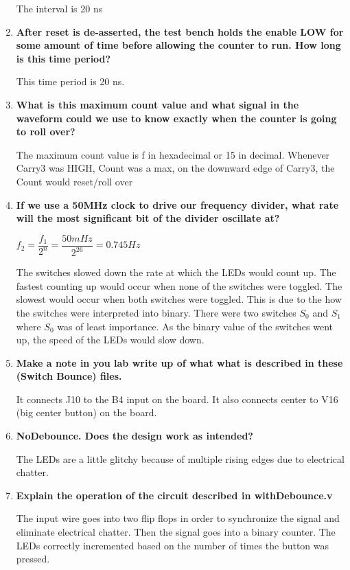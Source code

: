 \documentclass[a4paper,12pt]{article}
\begin{document}
\begin{enumerate}
  The interval is 20 ns
  
  \item \textbf{After reset is de-asserted, the test bench holds the enable LOW for some amount of time before 
  allowing the counter to run. How long is this time period?}
  
  This time period is 20 ns.
  
  \item \textbf{What is this maximum count value and what signal in the waveform could we use to know
  exactly when the counter is going to roll over?}
  
  The maximum count value is f in hexadecimal or 15 in decimal. Whenever Carry3 was HIGH, Count was a max, on the downward edge of Carry3, the Count would reset/roll over
  
  \item \textbf{If we use a 50MHz clock to drive our frequency divider, what rate will the most significant bit
  of the divider oscillate at?}
  
  $f_2 = \dfrac{f_1}{2^n} = \dfrac{50 mHz}{2^{26}} = 0.745 Hz$
  
  
  The switches slowed down the rate at which the LEDs would count up. The fastest counting up would occur when none of the switches were toggled. The slowest would occur when both switches were toggled. This is due to the how the switches were interpreted into binary. There were two switches $S_0$ and $S_1$ where $S_0$ was of least importance. As the binary value of the switches went up, the speed of the LEDs would slow down.
  
  \item \textbf{Make a note in you lab write up of what what is described in these (Switch Bounce) files.}
  
  It connects J10 to the B4 input on the board. It also connects center to V16 (big center button) on the board.

  \item \textbf{NoDebounce. Does the design work as intended?}
  
  The LEDs are a little glitchy because of multiple rising edges due to electrical chatter. 
  
  \item \textbf{Explain the operation of the circuit described in withDebounce.v}
  
  The input wire goes into two flip flops in order to synchronize the signal and eliminate electrical chatter. Then the signal goes into a binary counter. The LEDs correctly 
  incremented based on the number of times the button was pressed.     
  
\end{enumerate}
\end{document}
